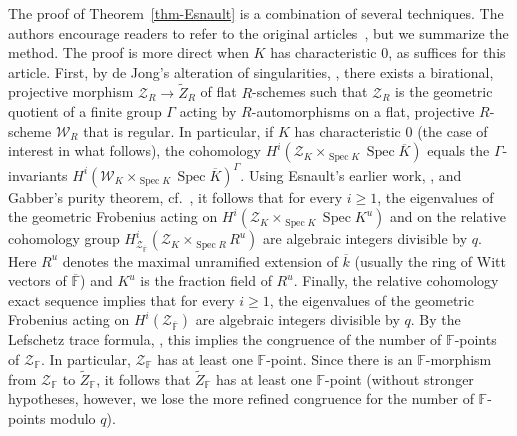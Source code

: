 \documentclass[11pt]{article}
\theoremstyle{definition}
\numberwithin{equation}{section}
\numberwithin{figure}{section}
\numberwithin{table}{section}
\newcommand{\mbb}{\mathbb}
\newcommand{\FF}{\mbb{F}}
\newcommand{\mc}{\mathcal}
\newcommand{\mcW}{\mc{W}}
\newcommand{\mcZ}{\mc{Z}}
\newcommand{\wt}{\widetilde}
\newcommand{\ol}{\overline}
\newcommand{\Rr}{R}
\newcommand{\FR}{K}
\DeclareMathOperator{\SP}{Spec}
\begin{document}
The proof of Theorem~\ref{thm-Esnault} is a combination of several techniques. The authors encourage readers to refer to the original articles~\cite{Esnaultpadic, EsnaultXu}, but we summarize the method. The proof is more direct when $\FR$ has characteristic $0$, as suffices for this article. First, by de Jong's alteration of singularities, \cite{dJalter}, there exists a birational, projective morphism $\mcZ_\Rr\to \wt{Z}_\Rr$ of flat $\Rr$-schemes such that $\mcZ_\Rr$ is the geometric quotient of a finite group $\Gamma$ acting by $\Rr$-automorphisms on a flat, projective $\Rr$-scheme $\mcW_\Rr$ that is regular. In particular, if $\FR$ has characteristic $0$ (the case of interest in what follows), the cohomology $H^i(\mcZ_\FR \times_{\SP \FR} \SP \ol{\FR})$ equals the $\Gamma$-invariants $H^i(\mcW_\FR \times_{\SP \FR} \SP
\ol{\FR})^\Gamma$. Using Esnault's earlier work, \cite{Esnault_integrality}, and Gabber's purity theorem, cf.~\cite{Fujiwara}, it follows that for every $i\geq 1$, the eigenvalues of the geometric Frobenius acting on $H^i(\mcZ_\FR \times_{\SP \FR} \SP \FR^u)$ and on the relative cohomology group $H^i_{\mcZ_{\ol{\FF}}}(\mcZ_\FR
\times_{\SP \Rr} \Rr^u)$ are algebraic integers divisible by $q$. Here $\Rr^u$ denotes the maximal unramified extension of $\ol{k}$ (usually the ring of Witt vectors of $\ol{\FF}$) and $\FR^u$ is the fraction field of $\Rr^u$. Finally, the relative cohomology exact sequence implies that for every $i\geq 1$, the eigenvalues of the geometric Frobenius acting on $H^i(\mcZ_{\ol{\FF}})$ are algebraic integers divisible by $q$. By the Lefschetz trace formula, \cite[Corollary~III.4.8, p.~109]{SGA5}, this implies the congruence of the number of $\FF$-points of $\mcZ_{\FF}$. In particular, $\mcZ_{\FF}$ has at least one $\FF$-point. Since there is an $\FF$-morphism from $\mcZ_{\FF}$ to $\wt{Z}_{\FF}$, it follows that $\wt{Z}_{\FF}$ has at least one $\FF$-point (without stronger hypotheses, however, we lose the more refined congruence for the number of $\FF$-points modulo $q$).
\end{document}
